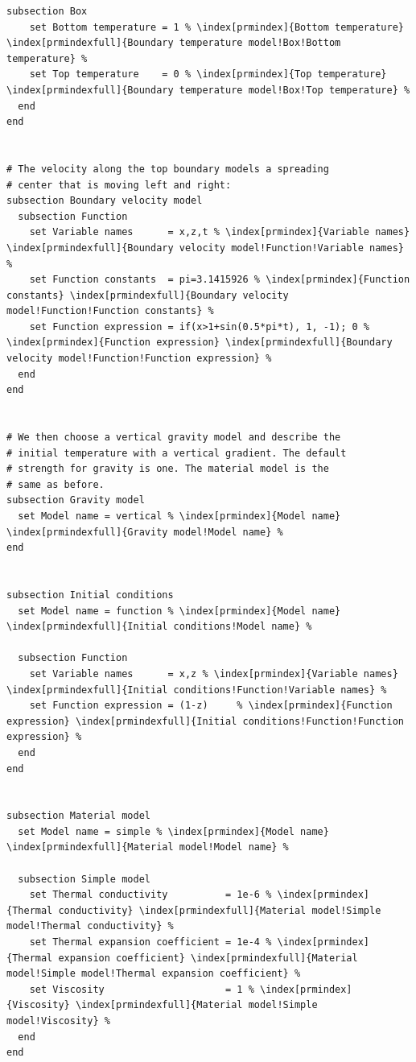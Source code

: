 \documentclass{article}
\begin{document}
\begin{lstlisting}[frame=single,language=prmfile,escapechar=\%]
  subsection Box
    set Bottom temperature = 1 % \index[prmindex]{Bottom temperature} \index[prmindexfull]{Boundary temperature model!Box!Bottom temperature} %
    set Top temperature    = 0 % \index[prmindex]{Top temperature} \index[prmindexfull]{Boundary temperature model!Box!Top temperature} %
  end
end


# The velocity along the top boundary models a spreading
# center that is moving left and right:
subsection Boundary velocity model
  subsection Function
    set Variable names      = x,z,t % \index[prmindex]{Variable names} \index[prmindexfull]{Boundary velocity model!Function!Variable names} %
    set Function constants  = pi=3.1415926 % \index[prmindex]{Function constants} \index[prmindexfull]{Boundary velocity model!Function!Function constants} %
    set Function expression = if(x>1+sin(0.5*pi*t), 1, -1); 0 % \index[prmindex]{Function expression} \index[prmindexfull]{Boundary velocity model!Function!Function expression} %
  end
end


# We then choose a vertical gravity model and describe the
# initial temperature with a vertical gradient. The default
# strength for gravity is one. The material model is the
# same as before.
subsection Gravity model
  set Model name = vertical % \index[prmindex]{Model name} \index[prmindexfull]{Gravity model!Model name} %
end


subsection Initial conditions
  set Model name = function % \index[prmindex]{Model name} \index[prmindexfull]{Initial conditions!Model name} %

  subsection Function
    set Variable names      = x,z % \index[prmindex]{Variable names} \index[prmindexfull]{Initial conditions!Function!Variable names} %
    set Function expression = (1-z)     % \index[prmindex]{Function expression} \index[prmindexfull]{Initial conditions!Function!Function expression} %
  end
end


subsection Material model
  set Model name = simple % \index[prmindex]{Model name} \index[prmindexfull]{Material model!Model name} %

  subsection Simple model
    set Thermal conductivity          = 1e-6 % \index[prmindex]{Thermal conductivity} \index[prmindexfull]{Material model!Simple model!Thermal conductivity} %
    set Thermal expansion coefficient = 1e-4 % \index[prmindex]{Thermal expansion coefficient} \index[prmindexfull]{Material model!Simple model!Thermal expansion coefficient} %
    set Viscosity                     = 1 % \index[prmindex]{Viscosity} \index[prmindexfull]{Material model!Simple model!Viscosity} %
  end
end



\end{lstlisting}
\end{document}
